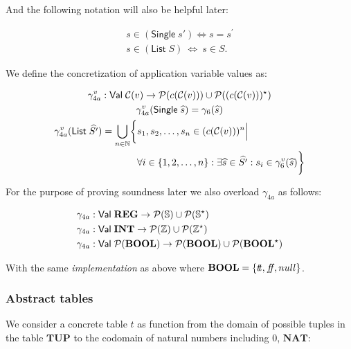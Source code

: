 And the following notation will also be helpful later:


\begin{align}
    s \in (\mathsf{Single} \; s') \iff s = s^\prime \\
    s \in (\mathsf{List} \; S) \ \iff \ s \in S.
\end{align}


We define the concretization of application variable values as:


\begin{gather}
    \gamma^v_{4a} : \mathsf{Val} \; \mathcal{C}(v) \rightarrow \mathcal{P}(c(\mathcal{C}(v))) \cup\mathcal{P}((c(\mathcal{C}(v)))^\star)\\
    \gamma^v_{4a}(\mathsf{Single} \; \widehat{s}) = \gamma_6(\widehat{s})\\
    \begin{split}
        \gamma^v_{4a}(\mathsf{List} \; \widehat{S'}) = \bigcup_{n \in \mathbb{N}}\biggl\{&s_1, s_2, \dots, s_n \in (c(\mathcal{C}(v)))^n \Big|\\
        &\forall i \in \{1, 2, \dots, n\} : \exists \widehat{s} \in \widehat{S'} : s_i \in \gamma^v_6(\widehat{s}) \biggr\}
    \end{split}
\end{gather}


For the purpose of proving soundness later we also overload $\gamma_{4a}$ as follows:


\begin{align}
    \gamma_{4a} &: \mathsf{Val} \; \mathbf{REG} \rightarrow \mathcal{P}(\mathbb{S}) \cup \mathcal{P}(\mathbb{S}^\star)\\
    \gamma_{4a} &: \mathsf{Val} \; \mathbf{INT} \rightarrow \mathcal{P}(\mathbb{Z}) \cup \mathcal{P}(\mathbb{Z}^\star) \\
    \gamma_{4a} &: \mathsf{Val} \; \mathcal{P}(\mathbf{BOOL}) \rightarrow \mathcal{P}(\mathbf{BOOL}) \cup \mathcal{P}(\mathbf{BOOL}^\star)
\end{align}

With the same \emph{implementation} as above where $\mathbf{BOOL} = \{t\!t, f\!\!f, null\}$.

\subsubsection{Abstract tables}\label{subsubsec:abstract_domain_of_tables}
We consider a concrete table $t$ as function from the domain of possible tuples in the table $\mathbf{TUP}$ to the codomain of natural numbers including $0$, $\mathbf{NAT}$:


